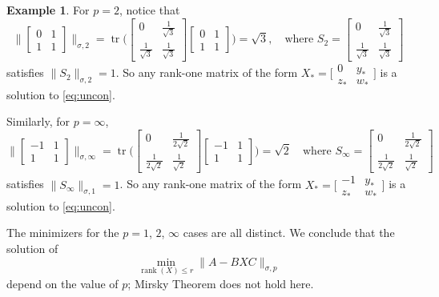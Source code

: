 \documentclass[11pt,reqno]{amsart}
\newcommand{\st}{\sigma}
\DeclareMathOperator{\rank}{rank}
\DeclareMathOperator{\tr}{tr}
\theoremstyle{definition}
\newtheorem{example}[theorem]{Example}
\numberwithin{equation}{section}
\begin{document}
\begin{example}
For $p=2$, notice that  
\[
    \biggl\lVert \begin{bmatrix}
        0 &1\\ 1 &1
    \end{bmatrix} \biggr\rVert_{\st,2} = \tr\Biggl(\begin{bmatrix}
    0 &\frac{1}{\sqrt{3}}\\
    \frac{1}{\sqrt{3}} &\frac{1}{\sqrt{3}}
\end{bmatrix} \begin{bmatrix}
    0 &1\\ 1 &1
\end{bmatrix} \Biggr) = \sqrt{3}, \quad \text{where }  S_2 = \begin{bmatrix}
    0 &\frac{1}{\sqrt{3}}\\
    \frac{1}{\sqrt{3}} &\frac{1}{\sqrt{3}}
\end{bmatrix}
\]
satisfies $\lVert S_2\rVert_{\st,2} =1$. So any rank-one matrix of the form $X_*  = \bigl[\begin{smallmatrix}
0 & y_* \\
z_* & w_*
\end{smallmatrix} \bigr]$ is a solution to \eqref{eq:uncon}.

Similarly, for $p=\infty$, 
\[
    \biggl\lVert \begin{bmatrix}
        -1 &1\\ 1 &1
    \end{bmatrix} \biggr\rVert_{\st,\infty} = \tr\Biggl(\begin{bmatrix}
        0 &\frac{1}{2\sqrt{2}}\\
        \frac{1}{2\sqrt{2}} &\frac{1}{\sqrt{2}}
    \end{bmatrix} \begin{bmatrix}
        -1 &1\\ 1 &1
    \end{bmatrix} \Biggr) = \sqrt{2} \quad \text{where } S_\infty = \begin{bmatrix}
        0 &\frac{1}{2\sqrt{2}}\\
        \frac{1}{2\sqrt{2}} &\frac{1}{\sqrt{2}}
    \end{bmatrix}
\]
satisfies $\lVert S_\infty\rVert_{\st,1} =1$. So any rank-one matrix of the form $X_*  = \bigl[\begin{smallmatrix}
-1 & y_* \\
z_* & w_*
\end{smallmatrix} \bigr]$ is a solution to \eqref{eq:uncon}.

The minimizers for the $p =1$, $2$, $\infty$ cases are all distinct. We conclude that the solution of
\[
\min_{\rank(X) \le r} \lVert  A- BXC \rVert_{\st,p}
\]
depend on the value of $p$; Mirsky Theorem does not hold here.
\end{example}
\end{document}
